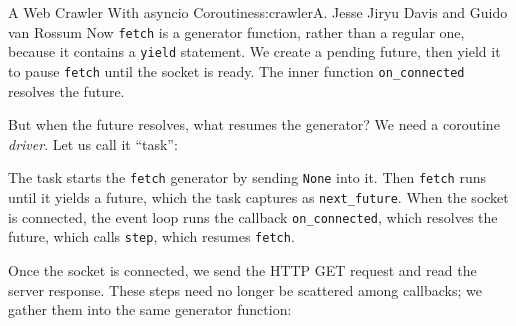 \begin{aosachapter}{A Web Crawler With asyncio Coroutines}{s:crawler}{A. Jesse Jiryu Davis and Guido van Rossum}
Now \texttt{fetch} is a generator function, rather than a regular one,
because it contains a \texttt{yield} statement. We create a pending
future, then yield it to pause \texttt{fetch} until the socket is ready.
The inner function \texttt{on\_connected} resolves the future.

But when the future resolves, what resumes the generator? We need a
coroutine \emph{driver}. Let us call it ``task'':

\begin{Shaded}
\begin{Highlighting}[]
 
     \NormalTok{(}
        \NormalTok{)}

     
        \NormalTok{:}
         \NormalTok{:}


\NormalTok{)}

\end{Highlighting}
\end{Shaded}

The task starts the \texttt{fetch} generator by sending \texttt{None}
into it. Then \texttt{fetch} runs until it yields a future, which the
task captures as \texttt{next\_future}. When the socket is connected,
the event loop runs the callback \texttt{on\_connected}, which resolves
the future, which calls \texttt{step}, which resumes \texttt{fetch}.

\label{factoring-coroutines-with-yield-from}

Once the socket is connected, we send the HTTP GET request and read the
server response. These steps need no longer be scattered among
callbacks; we gather them into the same generator function:

\begin{Shaded}
\begin{Highlighting}[]
     \NormalTok{):}
        \NormalTok{))}


\end{Highlighting}
\end{Shaded}
\end{aosachapter}

